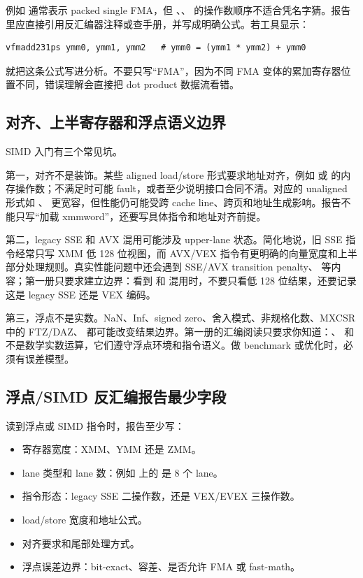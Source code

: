 例如  通常表示 packed single FMA，但 、、 的操作数顺序不适合凭名字猜。报告里应直接引用反汇编器注释或查手册，并写成明确公式。若工具显示：

\begin{lstlisting}
vfmadd231ps ymm0, ymm1, ymm2   # ymm0 = (ymm1 * ymm2) + ymm0
\end{lstlisting}

就把这条公式写进分析。不要只写“FMA”，因为不同 FMA 变体的累加寄存器位置不同，错误理解会直接把 dot product 数据流看错。

\subsection{对齐、上半寄存器和浮点语义边界}

SIMD 入门有三个常见坑。

第一，对齐不是装饰。某些 aligned load/store 形式要求地址对齐，例如  或  的内存操作数；不满足时可能 fault，或者至少说明接口合同不清。对应的 unaligned 形式如 、 更宽容，但性能仍可能受跨 cache line、跨页和地址生成影响。报告不能只写“加载 xmmword”，还要写具体指令和地址对齐前提。

第二，legacy SSE 和 AVX 混用可能涉及 upper-lane 状态。简化地说，旧 SSE 指令经常只写 XMM 低 128 位视图，而 AVX/VEX 指令有更明确的向量宽度和上半部分处理规则。真实性能问题中还会遇到 SSE/AVX transition penalty、 等内容；第一册只要求建立边界：看到  和  混用时，不要只看低 128 位结果，还要记录这是 legacy SSE 还是 VEX 编码。

第三，浮点不是实数。NaN、Inf、signed zero、舍入模式、非规格化数、MXCSR 中的 FTZ/DAZ、 都可能改变结果边界。第一册的汇编阅读只要求你知道：、 和  不是数学实数运算，它们遵守浮点环境和指令语义。做 benchmark 或优化时，必须有误差模型。

\subsection{浮点/SIMD 反汇编报告最少字段}

读到浮点或 SIMD 指令时，报告至少写：

\begin{itemize}
  \item 寄存器宽度：XMM、YMM 还是 ZMM。
  \item lane 类型和 lane 数：例如  上的  是 8 个  lane。
  \item 指令形态：legacy SSE 二操作数，还是 VEX/EVEX 三操作数。
  \item load/store 宽度和地址公式。
  \item 对齐要求和尾部处理方式。
  \item 浮点误差边界：bit-exact、容差、是否允许 FMA 或 fast-math。
\end{itemize}

